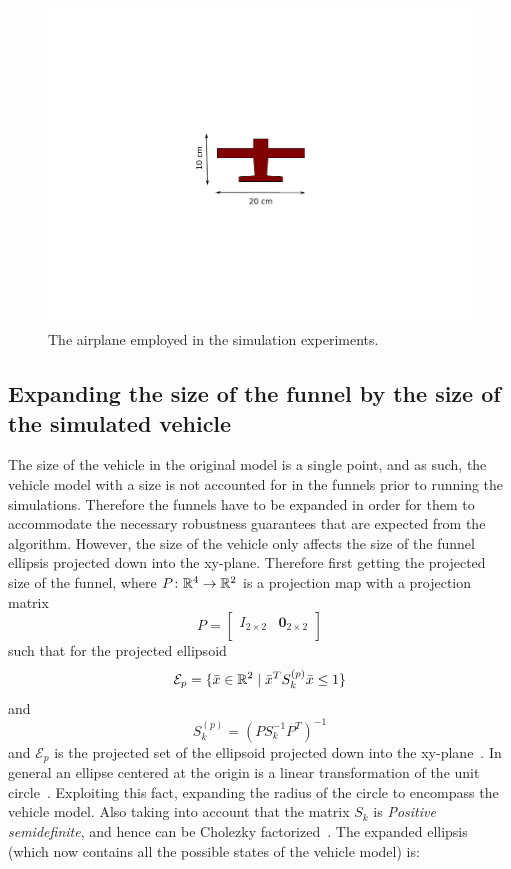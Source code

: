 \begin{figure}
  \centering \includegraphics[trim={5cm 5cm 5cm 5cm},
  width=\textwidth]{figures/experiments/radio-vehicle-model}
  \caption{The airplane employed in the simulation experiments.}
  \label{fig:radio-vehicle}
\end{figure}

\subsection{Expanding the size of the funnel by the size of the simulated
  vehicle}

The size of the vehicle in the original model is a single point, and as such,
the vehicle model with a size is not accounted for in the funnels prior to
running the simulations. Therefore the funnels have to be expanded in order for
them to accommodate the necessary robustness guarantees that are expected from
the algorithm. However, the size of the vehicle only affects the size of the
funnel ellipsis projected down into the xy-plane. Therefore first getting the
projected size of the funnel, where \(P \colon \mathbb{R}^4 \rightarrow \mathbb{R}^2\) is a
projection map with a projection matrix
\[
  P =
  \begin{bmatrix}
    I_{2 \times 2} & \mathbf{0}_{2 \times 2} \\
  \end{bmatrix}
\]
such that for the projected ellipsoid
\[
  \mathcal{E}_{p} = \lbrace\bar{x} \in \mathbb{R}^{2} \mid {\bar{x}}^{T}S_{k}^{(p)}\bar{x}
    \leq 1\rbrace
\]
and
\[
  S_{k}^{(p)} = {\left( PS_{k}^{-1}P^T \right)}^{-1}
\]
and \(\mathcal{E}_{p}\) is the projected set of the ellipsoid projected down
into the xy-plane~\cite{majumdarFunnelLibrariesRealtime2017}. In general an
ellipse centered at the origin is a linear transformation of the unit
circle~\cite{lay2005linear}. Exploiting this fact, expanding the radius of the
circle to encompass the vehicle model. Also taking into account that the matrix
\(S_{k}\) is \textit{Positive semidefinite}, and hence can be Cholezky
factorized~\cite{lay2005linear}. The expanded ellipsis (which now contains all
the possible states of the vehicle model) is:

